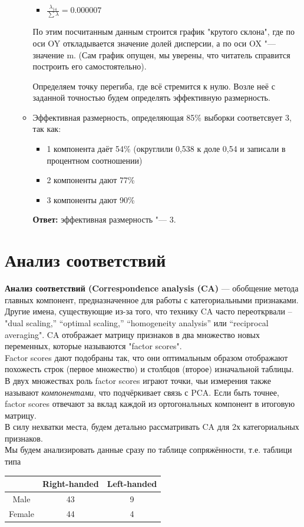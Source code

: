 \begin{enumerate}
\begin{itemize}
\begin{itemize}
            \item $\frac{ \lambda_{14} }{\sum \lambda} = 0.000007$
        \end{itemize} \par
        По этим посчитанным данным строится график "крутого склона", где по оси OY откладывается значение долей дисперсии, а по оси OX "--- значение m. (Сам график опущен, мы уверены, что читатель справится построить его самостоятельно). \par
        Определяем точку перегиба, где всё стремится к нулю. Возле неё с заданной точностью будем определять эффективную размерность.
        \item Эффективная размерность, определяющая 85\% выборки соответсвует 3, так как: \par
        \begin{itemize}
            \item 1 компонента даёт 54\% (округлили 0,538 к доле 0,54 и записали в процентном соотношении)
            \item 2 компоненты дают 77\%
            \item 3 компоненты дают 90\%
        \end{itemize}\par
        \textbf{Ответ:} эффективная размерность "--- 3.
    \end{itemize}

\end{enumerate}


\section{Анализ соответствий}
\textbf{Анализ соответствий (Correspondence analysis (CA)} — обобщение метода главных компонент, предназначенное для работы с
категориальными признаками. Другие имена, существующие из-за того, что технику CA часто переоткрвали -- "dual scaling,” “optimal scaling,” “homogeneity analysis” или “reciprocal averaging". CA отображает матрицу признаков в два множество новых переменных, которые называются "factor scores".\\
Factor scores  дают подобраны так, что они оптимальным образом отображают похожесть строк (первое множество) и столбцов (второе) изначальной таблицы. В двух множествах роль factor scores играют точки, чьи  измерения также называют \textit{компонентами}, что подчёркивает связь с PCA. Если быть точнее, factor scores отвечают за вклад каждой из ортогональных компонент в итоговую матрицу.\\
В силу нехватки места, будем детально рассматривать CA для 2х категориальных признаков.\\
Мы будем анализировать данные сразу по таблице сопряжённости, т.е. таблици типа 
\begin{table}[H]\centering
\begin{tabular}{|c|c|c|}
\hline  & Right-handed & Left-handed  \\
\hline Male & 43 & 9 \\
\hline Female & 44 & 4  \\
\hline
\end{tabular}
\end{table}
